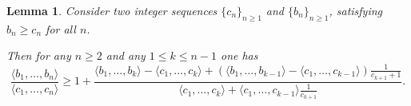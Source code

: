 \documentclass{amsart}
\newtheorem{lemma}[theorem]{Lemma}
\theoremstyle{definition}
\newcommand{\0}{\mbf 0}%
\begin{document}


\begin{lemma}\label{lemma:quotient:tnqn}
Consider two integer sequences $\{c_n\}_{n\geq1}$ and $\{b_n\}_{n\geq1}$, satisfying $b_n \geq c_n$ for all $n$.

Then for any $n\geq2$ and any $1\leq k\leq n-1$ one has
$$
\frac{\langle b_1,\ldots,b_n\rangle}{\langle c_1,\ldots,c_n\rangle} \geq 1 + \frac{\langle b_1,\ldots, b_k\rangle - \langle c_1,\ldots,c_k\rangle + (\langle b_1,\ldots, b_{k-1}\rangle - \langle c_1,\ldots,c_{k-1}\rangle ) \frac{1}{c_{k+1}+1}}{\langle c_1,\ldots,c_k\rangle +\langle c_1,\ldots,c_{k-1} \rangle \frac{1}{c_{k+1}}}.
$$
\end{lemma}
\end{document}
